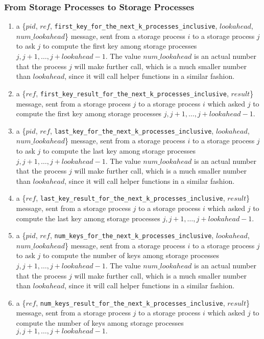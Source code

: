 \documentclass[11pt]{article}
\begin{document}
\subsubsection{From Storage Processes to Storage Processes}
\begin{enumerate}[M1]
\item a \{$pid$, $ref$, \texttt{first\_key\_for\_the\_next\_k\_processes\_inclusive}, $lookahead$, $num\_lookahead$\} message, sent from a storage process $i$ to a storage process $j$ to ask $j$ to compute the first key among storage processes $j, j + 1, \ldots, j + lookahead - 1.$ The value $num\_lookahead$ is an actual number that the process $j$ will make further call, which is a much smaller number than $lookahead$, since it will call helper functions in a similar fashion.
\item a \{$ref$, \texttt{first\_key\_result\_for\_the\_next\_k\_processes\_inclusive}, $result$\} message, sent from a storage process $j$ to a storage process $i$ which asked $j$ to compute the first key among storage processes $j, j + 1, \ldots, j + lookahead - 1.$


\item a \{$pid$, $ref$, \texttt{last\_key\_for\_the\_next\_k\_processes\_inclusive}, $lookahead$, $num\_lookahead$\} message, sent from a storage process $i$ to a storage process $j$ to ask $j$ to compute the last key among storage processes $j, j + 1, \ldots, j + lookahead - 1.$ The value $num\_lookahead$ is an actual number that the process $j$ will make further call, which is a much smaller number than $lookahead$, since it will call helper functions in a similar fashion.
\item a \{$ref$, \texttt{last\_key\_result\_for\_the\_next\_k\_processes\_inclusive}, $result$\} message, sent from a storage process $j$ to a storage process $i$ which asked $j$ to compute the last key among storage processes $j, j + 1, \ldots, j + lookahead - 1.$

\item a \{$pid$, $ref$, \texttt{num\_keys\_for\_the\_next\_k\_processes\_inclusive}, $lookahead$, $num\_lookahead$\} message, sent from a storage process $i$ to a storage process $j$ to ask $j$ to compute the number of keys among storage processes $j, j + 1, \ldots, j + lookahead - 1.$ The value $num\_lookahead$ is an actual number that the process $j$ will make further call, which is a much smaller number than $lookahead$, since it will call helper functions in a similar fashion.
\item a \{$ref$, \texttt{num\_keys\_result\_for\_the\_next\_k\_processes\_inclusive}, $result$\} message, sent from a storage process $j$ to a storage process $i$ which asked $j$ to compute the number of keys among storage processes $j, j + 1, \ldots, j + lookahead - 1.$
\end{enumerate}
\end{document}
